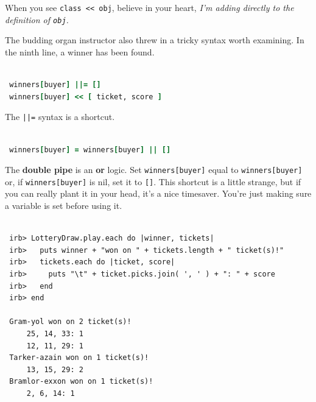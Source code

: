 \documentclass[10pt,twoside]{report}
\begin{document}
When you see \lstinline[breaklines=true]|class << obj|, believe in
your heart, {\em I'm adding directly to the definition of
  \lstinline[breaklines=true]|obj|.}

The budding organ instructor also threw in a tricky syntax worth
examining. In the ninth line, a winner has been found.


\begin{lstlisting}[basicstyle=\ttfamily\color{basiccolor},
    commentstyle = \ttfamily\color{commentcolor},
    keywordstyle=\ttfamily\color{keywordscolor},
    stringstyle=\color{stringcolor},
    language=Ruby,
    basicstyle=\small\ttfamily,
    showstringspaces=false,
  ]

 winners[buyer] ||= []
 winners[buyer] << [ ticket, score ]

\end{lstlisting}


The \lstinline[breaklines=true]$||=$ syntax is a shortcut.


\begin{lstlisting}[basicstyle=\ttfamily\color{basiccolor},
    commentstyle = \ttfamily\color{commentcolor},
    keywordstyle=\ttfamily\color{keywordscolor},
    stringstyle=\color{stringcolor},
    language=Ruby,
    basicstyle=\small\ttfamily,
    showstringspaces=false,
  ]

 winners[buyer] = winners[buyer] || []

\end{lstlisting}


The {\bf double pipe} is an {\bf or} logic.  Set
\lstinline[breaklines=true]|winners[buyer]| equal to
\lstinline[breaklines=true]|winners[buyer]| or, if
\lstinline[breaklines=true]|winners[buyer]| is nil, set it to
\lstinline[breaklines=true]|[]|.  This shortcut is a little strange,
but if you can really plant it in your head, it's a nice timesaver.
You're just making sure a variable is set before using it.


\begin{lstlisting}

 irb> LotteryDraw.play.each do |winner, tickets|
 irb>   puts winner + "won on " + tickets.length + " ticket(s)!"
 irb>   tickets.each do |ticket, score|
 irb>     puts "\t" + ticket.picks.join( ', ' ) + ": " + score
 irb>   end
 irb> end

 Gram-yol won on 2 ticket(s)!
     25, 14, 33: 1
     12, 11, 29: 1
 Tarker-azain won on 1 ticket(s)!
     13, 15, 29: 2
 Bramlor-exxon won on 1 ticket(s)!
     2, 6, 14: 1

\end{lstlisting}
\end{document}

